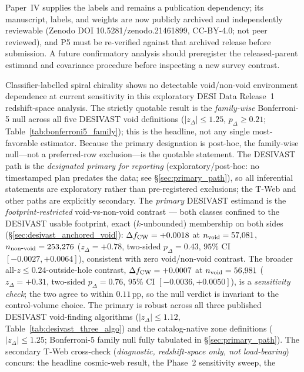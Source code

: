 \documentclass[twocolumn,linenumbers]{aastex702}
\begin{document}
Paper~IV supplies the labels and remains a publication dependency; its
manuscript, labels, and weights are now publicly archived and independently
reviewable (Zenodo DOI 10.5281/zenodo.21461899, CC-BY-4.0; not peer
reviewed), and P5 must be re-verified against that archived release before
submission. A future confirmatory analysis
should preregister the released-parent
estimand and covariance procedure before inspecting a new survey
contrast.

\iffalse
Classifier-labelled spiral chirality shows no detectable void/non-void
environment dependence at current sensitivity in this exploratory DESI
Data Release~1 redshift-space analysis.
The strictly quotable result is the \emph{family-wise} Bonferroni-5 null
across all five DESIVAST void definitions ($|z_\Delta|\!\le\!1.25$,
$p_\Delta\!\ge\!0.21$; Table~\ref{tab:bonferroni5_family}); this is the
headline, not any single most-favorable estimator.
Because the primary designation is post-hoc, the family-wise null---not
a preferred-row exclusion---is the quotable statement. The DESIVAST path is the
\emph{designated primary for reporting} (exploratory/post-hoc: no
timestamped plan predates the data; see \S\ref{sec:primary_path}), so
all inferential statements are exploratory rather than pre-registered exclusions;
the T-Web and other paths are explicitly secondary.
The \emph{primary} DESIVAST estimand is the
\emph{footprint-restricted} void-vs-non-void contrast --- both classes
confined to the DESIVAST usable footprint, exact ($k$-unbounded)
membership on both sides (\S\ref{sec:desivast_anchored_void}):
$\Delta f_{\rm CW} = +0.0018$ at $n_{\rm void} = 57{,}081$,
$n_{\rm non\mbox{-}void} = 253{,}276$
($z_\Delta = +0.78$, two-sided $p_\Delta = 0.43$, $95\%$ CI
$[-0.0027, +0.0064]$), consistent with zero void/non-void contrast. The broader
all-$z\!\le\!0.24$-outside-hole contrast, $\Delta f_{\rm CW} = +0.0007$
at $n_{\rm void} = 56{,}981$
($z_\Delta = +0.31$, two-sided $p_\Delta = 0.76$, $95\%$ CI
$[-0.0036, +0.0050]$), is a \emph{sensitivity check}; the two agree to
within $0.11$\,pp, so the null verdict is invariant to the control-volume
choice. The primary is robust across all three published DESIVAST
void-finding algorithms ($|z_\Delta| \leq 1.12$,
Table~\ref{tab:desivast_three_algo}) and the catalog-native zone
definitions ($|z_\Delta| \leq 1.25$; Bonferroni-5 family null
fully tabulated in \S\ref{sec:primary_path}). The secondary T-Web cross-check
(\emph{diagnostic, redshift-space only, not load-bearing}) concurs:
the headline cosmic-web result, the Phase~2 sensitivity sweep, the
\end{document}
